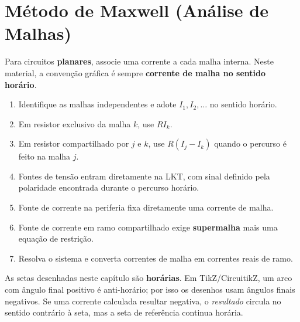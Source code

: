 
\section{Método de Maxwell (Análise de Malhas)}

\begin{conceito}
Para circuitos \textbf{planares}, associe uma corrente a cada malha interna.
Neste material, a convenção gráfica é sempre
\textbf{corrente de malha no sentido horário}.
\begin{enumerate}[leftmargin=1.7em,itemsep=2pt,topsep=3pt]
\item Identifique as malhas independentes e adote $I_1,I_2,\ldots$ no sentido horário.
\item Em resistor exclusivo da malha $k$, use $RI_k$.
\item Em resistor compartilhado por $j$ e $k$, use
      $R(I_j-I_k)$ quando o percurso é feito na malha $j$.
\item Fontes de tensão entram diretamente na LKT, com sinal definido pela
      polaridade encontrada durante o percurso horário.
\item Fonte de corrente na periferia fixa diretamente uma corrente de malha.
\item Fonte de corrente em ramo compartilhado exige \textbf{supermalha} mais
      uma equação de restrição.
\item Resolva o sistema e converta correntes de malha em correntes reais de ramo.
\end{enumerate}
\end{conceito}

\begin{atencao}
As setas desenhadas neste capítulo são \textbf{horárias}. Em TikZ/CircuitikZ,
um arco com ângulo final positivo é anti-horário; por isso os desenhos usam
ângulos finais negativos. Se uma corrente calculada resultar negativa, o
\emph{resultado} circula no sentido contrário à seta, mas a seta de referência
continua horária.
\end{atencao}

